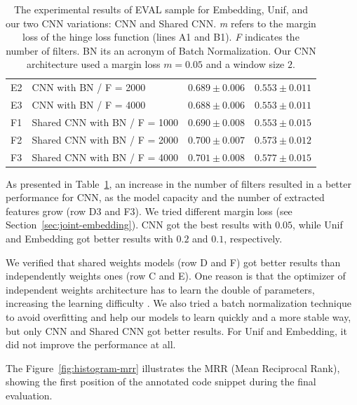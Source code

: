 \documentclass[sigconf]{acmart}
\begin{document}
\begin{table}[t]
\begin{tabular}{ p{1cm} p{6cm} >{\raggedleft\arraybackslash}p{4cm} >{\raggedleft\arraybackslash}p{4cm} }
 E2 & CNN with BN / F = 2000 & $0.689 \pm 0.006$ & $0.553 \pm 0.011$\\
 
 E3 & CNN with BN / F = 4000 & $0.688 \pm 0.006$ & $0.553 \pm 0.011$\\
 
 \hline
 
 F1 & Shared CNN with BN / F = 1000 & $0.690 \pm 0.008$ & $0.553 \pm 0.015$\\
 
 F2 & Shared CNN with BN / F = 2000 & $0.700 \pm 0.007$ & $0.573 \pm 0.012$\\
 
 F3 & Shared CNN with BN / F = 4000 & $0.701 \pm 0.008$ & $0.577 \pm 0.015$\\
 
\hline
\end{tabular}
\caption{The experimental results of EVAL sample for Embedding, Unif, and our two CNN variations: CNN and Shared CNN. \emph{m} refers to the margin loss of the hinge loss function (lines A1 and B1). \emph{F} indicates the number of filters. BN its an acronym of Batch Normalization. Our CNN architecture used a margin loss $m = 0.05$ and a window size $2$.}
\label{table:resultados}
\end{table}

As presented in Table~\ref{table:resultados}, an increase in the number of filters resulted in a better performance for CNN, as the model capacity and the number of extracted features grow (row D3 and F3). 
We tried different margin loss (see Section~\ref{sec:joint-embedding}). CNN got the best results with  $0.05$, while Unif and Embedding got better results with $0.2$ and $0.1$, respectively. 

We verified that shared weights models (row D and F) got better results than independently weights ones (row C and E). One reason is that the optimizer of independent weights architecture has to learn the double of parameters, increasing the learning difficulty \cite{feng-2015}. We also tried a batch normalization technique to avoid overfitting and help our models to learn quickly and a more stable way, but only CNN and Shared CNN got better results. For Unif and Embedding, it did not improve the performance at all. 

The Figure~\ref{fig:histogram-mrr} illustrates the MRR (Mean Reciprocal Rank), showing the first position of the annotated code snippet during the final evaluation.
\end{document}
